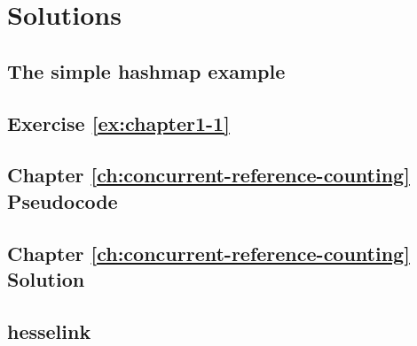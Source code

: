 \chapter{Solutions}

\section{The simple hashmap example}\label{sol:simple-hashmap}



\section{Exercise \ref{ex:chapter1-1}}


\section{Chapter \ref{ch:concurrent-reference-counting} Pseudocode}


\section{Chapter \ref{ch:concurrent-reference-counting} Solution}


\section{hesselink}

